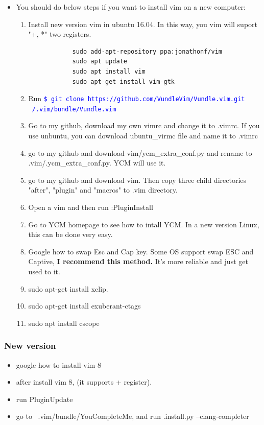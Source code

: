 \documentclass[a4paper,12pt,twoside]{book}
\newcommand{\linuxcommand}[1]{\texttt{\textcolor{blue}{\$ #1 \Pisymbol{psy}{191}}}}
\begin{document}
\begin{itemize}
		\item You should do below steps if you want to install vim on a new computer:

\begin{enumerate}
	\item Install new version vim in ubuntu 16.04. In this way, you vim will suport "+, *" two registers. 
			\begin{verbatim}
			sudo add-apt-repository ppa:jonathonf/vim
			sudo apt update
			sudo apt install vim
			sudo apt-get install vim-gtk
			\end{verbatim}

		\item Run \linuxcommand{git clone https://github.com/VundleVim/Vundle.vim.git ~/.vim/bundle/Vundle.vim}

		\item Go to my github, download my own vimrc and change it to .vimrc. If you use unbuntu, you can download ubuntu\_virmc file and name it to .vimrc
		
		\item go to my github and download vim/ycm\_extra\_conf.py and rename to .vim/.ycm\_extra\_conf.py. YCM will use it. 

		\item go to my github and download vim. Then copy three child directories "after", "plugin" and "macros" to .vim directory.

		\item Open a vim and then run :PluginInstall
		
		\item Go to YCM homepage to see how to intall YCM. In a new version Linux, this can be done very easy.
		
		\item Google how to swap Esc and Cap key. Some OS support swap ESC and Captive, \textbf{I recommend this method.} It's more reliable and just get used to it.
		\item sudo apt-get install xclip.  
		\item sudo apt-get install exuberant-ctags
        \item sudo apt install cscope
		
\end{enumerate}

\end{itemize}
\subsubsection{New version}
\begin{itemize}
		\item google how to install vim 8
		\item after install vim 8, (it supports + register).
		\item run PluginUpdate
		\item go to ~.vim/bundle/YouCompleteMe, and run .install.py --clang-completer
\end{itemize}
\end{document}

